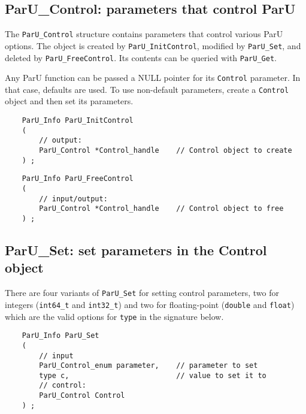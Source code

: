 \documentclass[12pt]{article}
\begin{document}
\subsection{{\sf ParU\_Control}: parameters that control ParU}
\label{control}

    The \verb'ParU_Control' structure contains parameters that control various
    ParU options.  The object is created by \verb'ParU_InitControl',
    modified by \verb'ParU_Set', and deleted by \verb'ParU_FreeControl'.
    Its contents can be queried with \verb'ParU_Get'.

    Any ParU function can be passed a NULL pointer for its \verb'Control'
    parameter.  In that case, defaults are used.  To use non-default
    parameters, create a \verb'Control' object and then set its parameters.

    {\footnotesize
    \begin{verbatim}
    ParU_Info ParU_InitControl
    (
        // output:
        ParU_Control *Control_handle    // Control object to create
    ) ; \end{verbatim}}

    {\footnotesize
    \begin{verbatim}
    ParU_Info ParU_FreeControl
    (
        // input/output:
        ParU_Control *Control_handle    // Control object to free
    ) ; \end{verbatim}}

\subsection{{\sf ParU\_Set}: set parameters in the Control object}
\label{set}

There are four variants of \verb'ParU_Set' for setting control parameters, two
for integers (\verb'int64_t' and \verb'int32_t') and two for floating-point
(\verb'double' and \verb'float') which are the valid options for \verb'type' in
the signature below.

    {\footnotesize
    \begin{verbatim}
    ParU_Info ParU_Set
    (
        // input
        ParU_Control_enum parameter,    // parameter to set
        type c,                         // value to set it to
        // control:
        ParU_Control Control
    ) ; \end{verbatim}}
\end{document}
